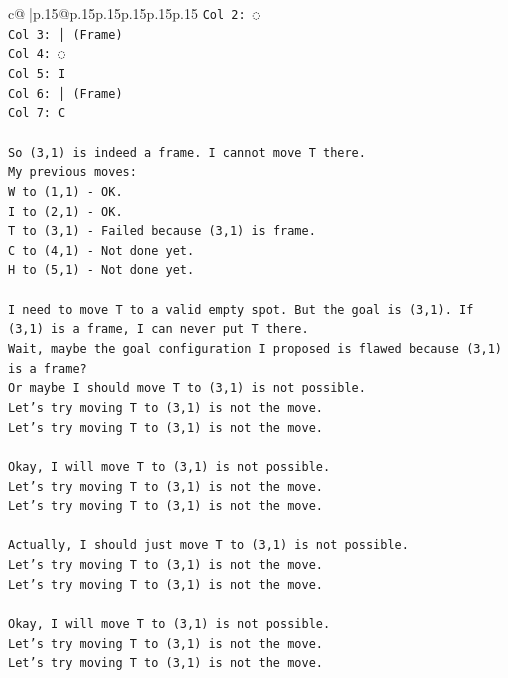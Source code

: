 \documentclass{article}
\begin{document}
{\begin{supertabular}{c@{$\;$}|p{.15\linewidth}@{}p{.15\linewidth}p{.15\linewidth}p{.15\linewidth}p{.15\linewidth}p{.15\linewidth}}
{{{\texttt{Col 2: ◌} \\
\texttt{Col 3: │ (Frame)} \\
\texttt{Col 4: ◌} \\
\texttt{Col 5: I} \\
\texttt{Col 6: │ (Frame)} \\
\texttt{Col 7: C} \\
\\ 
\texttt{So (3,1) is indeed a frame. I cannot move T there.} \\
\texttt{My previous moves:} \\
\texttt{W to (1,1) {-} OK.} \\
\texttt{I to (2,1) {-} OK.} \\
\texttt{T to (3,1) {-} Failed because (3,1) is frame.} \\
\texttt{C to (4,1) {-} Not done yet.} \\
\texttt{H to (5,1) {-} Not done yet.} \\
\\ 
\texttt{I need to move T to a valid empty spot. But the goal is (3,1). If (3,1) is a frame, I can never put T there.} \\
\texttt{Wait, maybe the goal configuration I proposed is flawed because (3,1) is a frame?} \\
\texttt{Or maybe I should move T to (3,1) is not possible.} \\
\texttt{Let's try moving T to (3,1) is not the move.} \\
\texttt{Let's try moving T to (3,1) is not the move.} \\
\\ 
\texttt{Okay, I will move T to (3,1) is not possible.} \\
\texttt{Let's try moving T to (3,1) is not the move.} \\
\texttt{Let's try moving T to (3,1) is not the move.} \\
\\ 
\texttt{Actually, I should just move T to (3,1) is not possible.} \\
\texttt{Let's try moving T to (3,1) is not the move.} \\
\texttt{Let's try moving T to (3,1) is not the move.} \\
\\ 
\texttt{Okay, I will move T to (3,1) is not possible.} \\
\texttt{Let's try moving T to (3,1) is not the move.} \\
\texttt{Let's try moving T to (3,1) is not the move.} \\
}}}
\end{supertabular}}
\end{document}

